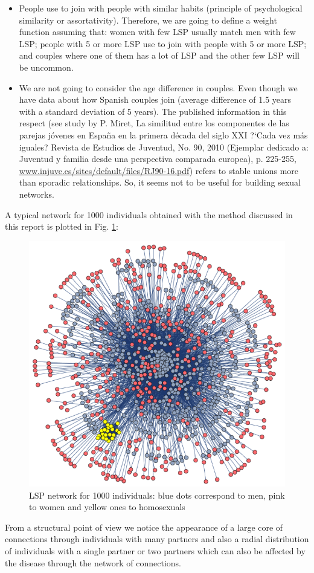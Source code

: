 \begin{itemize}
	\item People use to join with people with similar habits (principle of psychological similarity or assortativity). Therefore, we are going to define a weight function assuming that: women with few LSP usually match men with few LSP; people with 5 or more LSP use to join with people with 5 or more LSP; and couples where one of them has a lot of LSP and the other few LSP will be uncommon.

	\item We are not going to consider the age difference in couples. Even though we have data about how Spanish couples join (average difference of 1.5 years with a standard deviation of 5 years). The published information in this respect  (see study by P. Miret,  La similitud entre los componentes de las parejas j\'ovenes en Espa\~{n}a en la primera d\'ecada del siglo XXI  ?`Cada vez m\'as iguales? Revista de Estudios de Juventud, No. 90, 2010 (Ejemplar dedicado a: Juventud y familia desde una perspectiva comparada europea), p. 225-255, \url{www.injuve.es/sites/default/files/RJ90-16.pdf}) refers to stable unions more than sporadic relationships. So, it seems not to be useful for building sexual networks.
\end{itemize}
A typical network for 1000 individuals obtained with the method discussed in this report is plotted in Fig. \ref{LSPNET}:
\begin{figure}[ht]
	\centering
	\includegraphics{IMG/LSP.png}
	\caption{LSP network for 1000 individuals: blue dots correspond to men, pink to women and yellow ones to homosexuals}
	\label{LSPNET}
\end{figure}

From a structural point of view we notice the appearance of a large core of connections through individuals with many partners and also a radial distribution of individuals with a single partner or two partners which can also be affected by the disease through the network of connections.

